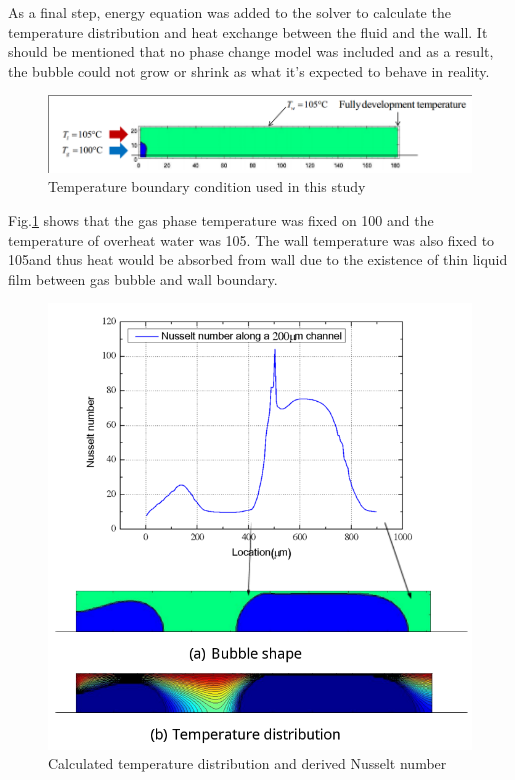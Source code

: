 \documentclass[a4,14pt]{extarticle}
\begin{document}
As a final step, energy equation was added to the solver to calculate the temperature
distribution and heat exchange between the fluid and the wall. It should be mentioned that
no phase change model was included and as a result, the bubble could not grow or shrink
as what it's expected to behave in reality.

\begin{figure}[h!]
  \centering
  \includegraphics[width=15cm]{heat_model.png}
  \caption{Temperature boundary condition used in this study}
  \label{fig:heat_model}
\end{figure}

Fig.\ref{fig:heat_model} shows that the gas phase temperature was fixed on 100\celsius
 and the temperature of overheat water was 105\celsius. The wall temperature was also
fixed to 105\celsius  and thus heat would be absorbed from wall due to the existence
of thin liquid film between gas bubble and wall boundary.

\begin{figure}[h!]
  \centering
  \includegraphics[width=12cm]{nusselt_result.png}
  \caption{Calculated temperature distribution and derived Nusselt number}
  \label{fig:nusselt_result}
\end{figure}
\end{document}
